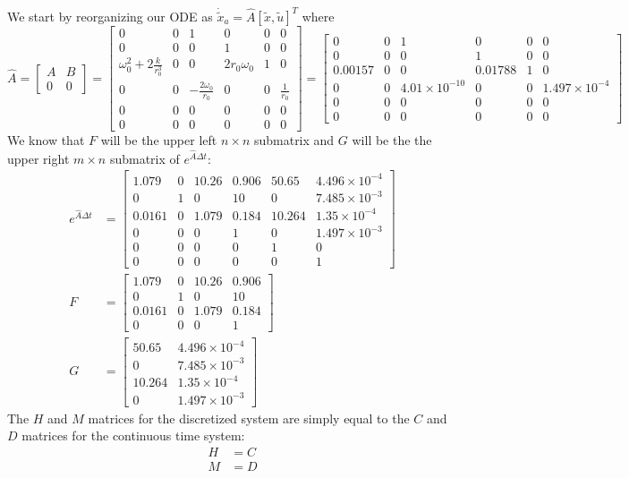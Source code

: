 \documentclass[11pt]{article}
\begin{document}
\subparagraph*{}
We start by reorganizing our ODE as $\dot{\tilde{x}}_a = \hat{A}[\tilde{x}, \tilde{u}]^T$ where
\begin{equation*}
	\hat{A} = \begin{bmatrix} A & B \\ 0 & 0 \end{bmatrix} = \begin{bmatrix} 0 & 0 & 1 & 0 & 0 & 0 \\ 0 & 0 & 0 & 1 & 0 & 0 \\ \omega_0^2 + 2\frac{k}{r_0^3} & 0 & 0 & 2r_0\omega_0 & 1 & 0 \\ 0 & 0 & -\frac{2\omega_0}{r_0} & 0 & 0 & \frac{1}{r_0} \\ 0 & 0 & 0 & 0 & 0 & 0 \\ 0 & 0 & 0 & 0 & 0 & 0 \end{bmatrix} = \begin{bmatrix} 0 & 0 & 1 & 0 & 0 & 0 \\ 0 & 0 & 0 & 1 & 0 & 0 \\ 0.00157 & 0 & 0 & 0.01788 & 1 & 0 \\ 0 & 0 & 4.01\times10^{-10} & 0 & 0 & 1.497\times10^{-4} \\ 0 & 0 & 0 & 0 & 0 & 0 \\ 0 & 0 & 0 & 0 & 0 & 0 \end{bmatrix}
\end{equation*}
We know that $F$ will be the upper left $n\times n$ submatrix and $G$ will be the the upper right $m\times n$ submatrix of $e^{\hat{A}\Delta t}$:
\begin{align*}
	e^{\hat{A}\Delta t} &= \begin{bmatrix} 1.079 & 0 & 10.26 & 0.906 & 50.65 & 4.496\times10^{-4} \\ 0 & 1 & 0 & 10 & 0 & 7.485\times10^{-3} \\ 0.0161 & 0 & 1.079 & 0.184 & 10.264 & 1.35\times10^{-4} \\ 0 & 0 & 0 & 1 & 0 & 1.497\times10^{-3} \\ 0 & 0 & 0 & 0 & 1 & 0 \\ 0 & 0 & 0 & 0 & 0 & 1 \end{bmatrix} \\
	F &= \begin{bmatrix} 1.079 & 0 & 10.26 & 0.906 \\ 0 & 1 & 0 & 10 \\ 0.0161 & 0 & 1.079 & 0.184\\ 0 & 0 & 0 & 1 \end{bmatrix} \\
	G &= \begin{bmatrix} 50.65 & 4.496\times10^{-4} \\ 0 & 7.485\times10^{-3} \\ 10.264 & 1.35\times10^{-4} \\ 0 & 1.497\times10^{-3} \end{bmatrix}
\end{align*}
The $H$ and $M$ matrices for the discretized system are simply equal to the $C$ and $D$ matrices for the continuous time system:
\begin{align*}
	H &= C \\
	M &= D
\end{align*}
\end{document}
